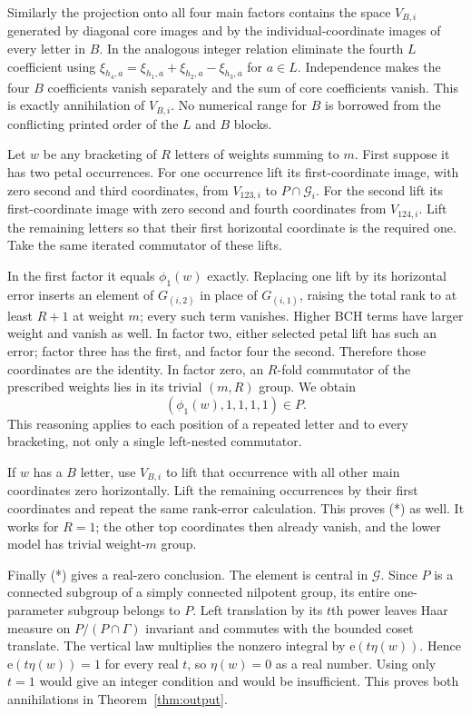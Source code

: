 \documentclass[11pt]{article}
\newcommand{\ee}{\mathrm e}\newcommand{\DR}{\mathrm{DR}}
\begin{document}
Similarly the projection onto all four main factors contains the space
$V_{B,i}$ generated by diagonal core images and by the individual-coordinate
images of every letter in $B$. In the analogous integer relation eliminate
the fourth $L$ coefficient using
$\xi_{h_4,a}=\xi_{h_1,a}+\xi_{h_2,a}-\xi_{h_3,a}$ for $a\in L$.
Independence makes the four $B$ coefficients vanish separately and the sum
of core coefficients vanish. This is exactly annihilation of $V_{B,i}$.
No numerical range for $B$ is borrowed from the conflicting printed order
of the $L$ and $B$ blocks.

Let $w$ be any bracketing of $R$ letters of weights summing to $m$.
First suppose it has two petal occurrences. For one occurrence lift its
first-coordinate image, with zero second and third coordinates, from
$V_{123,i}$ to $P\cap\mathcal G_i$. For the second lift its first-coordinate
image with zero second and fourth coordinates from $V_{124,i}$. Lift the
remaining letters so that their first horizontal coordinate is the required
one. Take the same iterated commutator of these lifts.

In the first factor it equals $\phi_1(w)$ exactly. Replacing one lift by its
horizontal error inserts an element of $G_{(i,2)}$ in place of
$G_{(i,1)}$, raising the total rank to at least $R+1$ at weight $m$;
every such term vanishes. Higher BCH terms have larger weight and vanish
as well. In factor two, either selected petal lift has such an error;
factor three has the first, and factor four the second. Therefore those
coordinates are the identity. In factor zero, an $R$-fold commutator of
the prescribed weights lies in its trivial $(m,R)$ group. We obtain
\[
                 (\phi_1(w),1,1,1,1)\in P.                 \tag{*}
\]
This reasoning applies to each position of a repeated letter and to every
bracketing, not only a single left-nested commutator.

If $w$ has a $B$ letter, use $V_{B,i}$ to lift that occurrence with all
other main coordinates zero horizontally. Lift the remaining occurrences
by their first coordinates and repeat the same rank-error calculation.
This proves (*) as well. It works for $R=1$; the other top coordinates then
already vanish, and the lower model has trivial weight-$m$ group.

Finally (*) gives a real-zero conclusion. The element is central in
$\mathcal G$. Since $P$ is a connected subgroup of a simply connected
nilpotent group, its entire one-parameter subgroup belongs to $P$.
Left translation by its $t$th power leaves Haar measure on $P/(P\cap\Gamma)$
invariant and commutes with the bounded coset translate. The vertical law
multiplies the nonzero integral by $\ee(t\eta(w))$. Hence
$\ee(t\eta(w))=1$ for every real $t$, so $\eta(w)=0$ as a real number.
Using only $t=1$ would give an integer condition and would be insufficient.
This proves both annihilations in Theorem~\ref{thm:output}.
\end{document}
